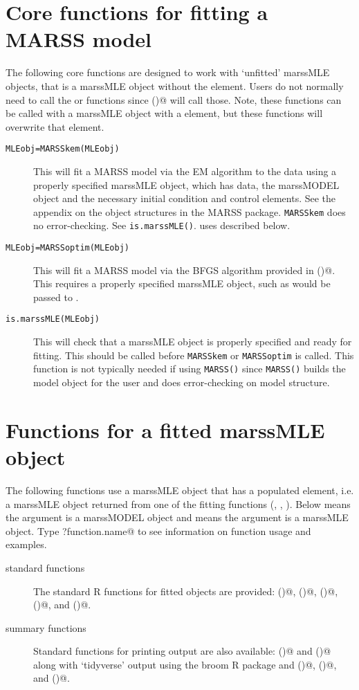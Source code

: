 \section{Core functions for fitting a MARSS model}
The following core functions are designed to work with `unfitted' marssMLE objects, that is a marssMLE object without the \verb@par@ element.  Users do not normally need to call the \verb@MARSSkem@ or \verb@MARSSoptim@ functions since \verb@MARSS()@ will call those. Note, these functions can be called with a marssMLE object with a \verb@par@ element, but these functions will overwrite that element.

\begin{description}
	\item[\texttt{MLEobj=MARSSkem(MLEobj)}] This will fit a MARSS model via the EM algorithm to the data using a properly specified marssMLE object, which has data, the marssMODEL object and the necessary initial condition and control elements.  See the appendix on the object structures in the MARSS package.  \texttt{MARSSkem}	does no error-checking.  See \texttt{is.marssMLE()}. \verb@MARSSkem@ uses \verb@MARSSkf@ described below.  
	\item[\texttt{MLEobj=MARSSoptim(MLEobj)}] This will fit a MARSS model via the BFGS algorithm provided in \verb@optim()@. This requires a properly specified marssMLE object, such as would be passed to \verb@MARSSkem@. 
	\item[\texttt{is.marssMLE(MLEobj)}] This will check that a marssMLE object is properly specified and ready for fitting.  This should be called before \texttt{MARSSkem} or \texttt{MARSSoptim} is called.  This function is not typically needed if using \texttt{MARSS()} since \texttt{MARSS()} builds the model object for the user and does error-checking on model structure.
\end{description}

\section{Functions for a fitted marssMLE object}
The following functions use a marssMLE object that has a populated \verb@par@ element, i.e. a marssMLE object returned from one of the fitting functions (\verb@MARSS@, \verb@MARSSkem@, \verb@MARSSoptim@).  Below \verb@MODELobj@ means the argument is a marssMODEL object and \verb@MLEobj@ means the argument is a marssMLE object.  Type \verb@?function.name@ to see information on function usage and examples.
\begin{description}
  \item[standard functions] The standard R functions for fitted objects are provided: \verb@residuals()@, \verb@fitted()@, \verb@logLik()@, \verb@AIC()@, and \verb@coef()@.
  \item[summary functions] Standard functions for printing output are also available: \verb@summary()@ and \verb@print()@ along with `tidyverse' output using the broom R package and \verb@augment()@, \verb@tidy()@, and \verb@glance()@.
\end{description}

